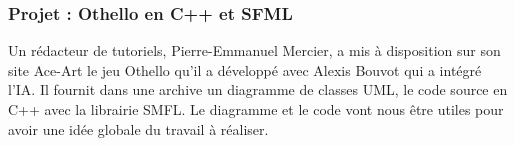 \documentclass[a4paper,12pt]{article}
\begin{document}
\subsubsection{Projet : Othello en C++ et SFML}
Un rédacteur de tutoriels, Pierre-Emmanuel Mercier, a mis à
disposition sur son site Ace-Art le jeu Othello \cite{projothello2} qu'il a développé avec Alexis Bouvot qui a intégré l'IA.  
Il fournit dans une archive un diagramme de classes UML, le code source en C++ avec la librairie SMFL. 
Le diagramme et le code vont nous être utiles pour avoir une idée globale du travail à réaliser.
 



 
\end{document}
